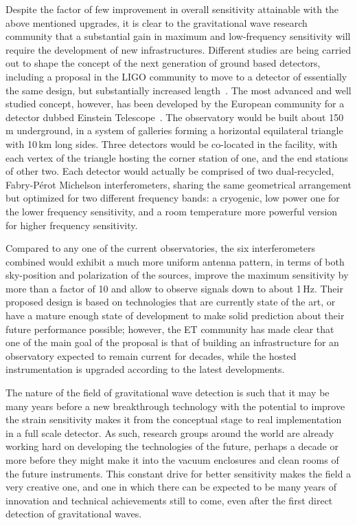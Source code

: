 Despite the factor of few improvement in overall sensitivity attainable with the above mentioned upgrades, it is clear to the gravitational wave research community that a substantial gain in maximum and low-frequency sensitivity will require the development of new infrastructures. 
Different studies are being carried out to shape the concept of the next generation of ground based detectors, including a proposal in the LIGO community to move to a detector of essentially the same design, but substantially increased length~\cite{Dwyer2015}.
The most advanced and well studied concept, however, has been developed by the European community for a detector dubbed Einstein Telescope~\cite{Punturo2010}.
The observatory would be built about 150\,m underground, in a system of galleries forming a horizontal equilateral triangle with 10\,km long sides. Three detectors would be co-located in the facility, with each vertex of the triangle hosting the corner station of one, and the end stations of other two.
Each detector would actually be comprised of two dual-recycled, Fabry-P\'{e}rot Michelson  interferometers, sharing the same geometrical arrangement but optimized for two different frequency bands: a cryogenic, low power one for the lower frequency sensitivity, and a room temperature more powerful version for higher frequency sensitivity.

Compared to any one of the current observatories, the six interferometers combined would exhibit a much more uniform antenna pattern, in terms of both sky-position and polarization of the sources, improve the maximum sensitivity by more than a factor of 10 and allow to observe signals down to about 1\,Hz. 
Their proposed design is based on technologies that are currently state of the art, or have a mature enough state of development to make solid prediction about their future performance possible; however, the ET community has made clear that one of the main goal of the proposal is that of building an infrastructure for an observatory expected to remain current for decades, while the hosted instrumentation is upgraded according to the latest developments.

The nature of the field of gravitational wave detection is such that it may be many years before a new breakthrough technology with the potential to improve the strain sensitivity makes it from the conceptual stage to real implementation in a full scale detector. 
As such, research groups around the world are already working hard on developing the technologies of the future, perhaps a decade or more before they might make it into the vacuum enclosures and clean rooms of the future instruments. 
This constant drive for better sensitivity makes the field a very creative one, and one in which there can be expected to be many years of innovation and technical achievements still to come, even after the first direct detection of gravitational waves.